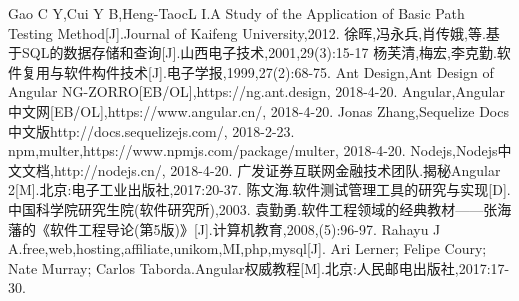 
\begin{thebibliography}{123456}
	Gao C Y,Cui Y B,Heng-TaocL I.A Study of the Application of Basic Path Testing Method[J].Journal of Kaifeng University,2012.
	徐晖,冯永兵,肖传娥,等.基于SQL的数据存储和查询[J].山西电子技术,2001,29(3):15-17
	杨芙清,梅宏,李克勤.软件复用与软件构件技术[J].电子学报,1999,27(2):68-75.
	Ant Design,Ant Design of Angular NG-ZORRO[EB/OL],https://ng.ant.design, 2018-4-20.
	Angular,Angular中文网[EB/OL],https://www.angular.cn/, 2018-4-20.
	Jonas Zhang,Sequelize Docs 中文版http://docs.sequelizejs.com/, 2018-2-23.
	npm,multer,https://www.npmjs.com/package/multer, 2018-4-20.
	Nodejs,Nodejs中文文档,http://nodejs.cn/, 2018-4-20.
	广发证券互联网金融技术团队.揭秘Angular 2[M].北京:电子工业出版社,2017:20-37.
	陈文海.软件测试管理工具的研究与实现[D].中国科学院研究生院(软件研究所),2003.
	袁勤勇.软件工程领域的经典教材——张海藩的《软件工程导论(第5版)》[J].计算机教育,2008,(5):96-97.
	Rahayu J A.free,web,hosting,affiliate,unikom,MI,php,mysql[J].
	Ari Lerner; Felipe Coury; Nate Murray; Carlos Taborda.Angular权威教程[M].北京:人民邮电出版社,2017:17-30.
\end{thebibliography}
